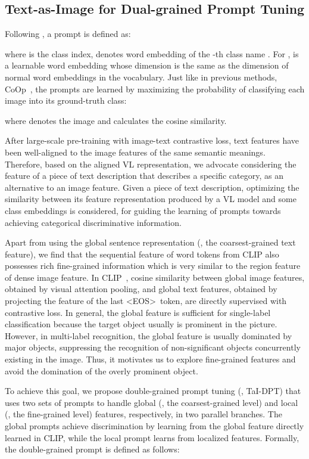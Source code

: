 \documentclass[10pt,twocolumn,letterpaper]{article}
\begin{document}
\subsection{Text-as-Image for Dual-grained Prompt Tuning}
\label{methods2}


Following \cite{coop}, a prompt is defined as:

where  is the class index,  denotes word embedding of the -th class name . For ,  is a learnable word embedding whose dimension is the same as the dimension of normal word embeddings in the vocabulary. 
Just like in previous methods, \eg CoOp~\cite{coop}, the prompts are learned by maximizing the probability of classifying each image into its ground-truth class:

\noindent where  denotes the image and  calculates the cosine similarity.

After large-scale pre-training with image-text contrastive loss, text features have been well-aligned to the image features of the same semantic meanings.
Therefore, based on the aligned VL representation, we advocate considering the feature of a piece of text description that describes a specific category, as an alternative to an image feature.
Given a piece of text description, optimizing the similarity between its feature representation produced by a VL model and some class embeddings is considered, for guiding the learning of prompts towards achieving categorical discriminative information.

Apart from using the global sentence representation (\ie, the coarsest-grained text feature), we find that the sequential feature of word tokens from CLIP also possesses rich fine-grained information which is very similar to the region feature of dense image feature. In CLIP~\cite{clip}, cosine similarity between global image features, obtained by visual attention pooling, and global text features, obtained by projecting the feature of the last \textless EOS\textgreater~token, are directly supervised with contrastive loss. 
In general, the global feature is sufficient for single-label classification because the target object usually is prominent in the picture. However, in multi-label recognition, the global feature is usually dominated by major objects, suppressing the recognition of non-significant objects concurrently existing in the image.
Thus, it motivates us to explore fine-grained features and avoid the domination of the overly prominent object.


To achieve this goal, we propose double-grained prompt tuning (\ie, TaI-DPT) that uses two sets of prompts to handle global (\ie, the coarsest-grained level) and local (\ie, the fine-grained level) features, respectively, in two parallel branches. The global prompts achieve discrimination by learning from the global feature directly learned in CLIP, while the local prompt learns from localized features. 
Formally, the double-grained prompt is defined as follows:
\end{document}
